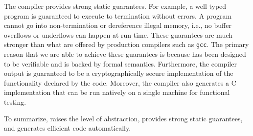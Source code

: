 The \tool compiler provides strong static guarantees. For example, a well typed
\tool program is guaranteed to execute to termination without errors. A \tool program cannot go into non-termination or dereference illegal memory, i.e., no buffer overflows or underflows can happen at run time. These guarantees are
much stronger than what are offered by production compilers such as {\tt gcc}.
The primary reason that we are able to achieve these guarantees is because
\tool has been designed to be verifiable and is backed by formal semantics. 
Furthermore, the compiler output is guaranteed to be a cryptographically secure
implementation of the functionality declared by the \tool code. 
Moreover, the \tool compiler also generates a C implementation that can be run natively on a single machine for functional testing. 

To summarize, \tool raises the level of abstraction, provides strong static guarantees, and generates efficient code automatically.
